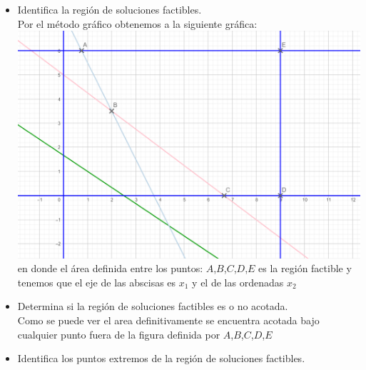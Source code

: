 \documentclass{article}
\begin{document}
\begin{itemize}
    \item Identifica la región de soluciones factibles.\\
            
            Por el método gráfico obtenemos a la siguiente gráfica:\\
            
                \includegraphics[scale=0.2]{s/imagen.png}
                \\
            en donde el área definida entre los puntos: $A$,$B$,$C$,$D$,$E$ es la región factible y tenemos que el eje de las abscisas es $x_1$ y el de las ordenadas $x_2$
    \item Determina si la región de soluciones factibles es o no acotada.\\
    
            Como se puede ver el area definitivamente se encuentra acotada bajo cualquier punto fuera de la figura definida por $A$,$B$,$C$,$D$,$E$
    \item Identifica los puntos extremos de la región de soluciones factibles.\\
    

\end{itemize}
\end{document}
